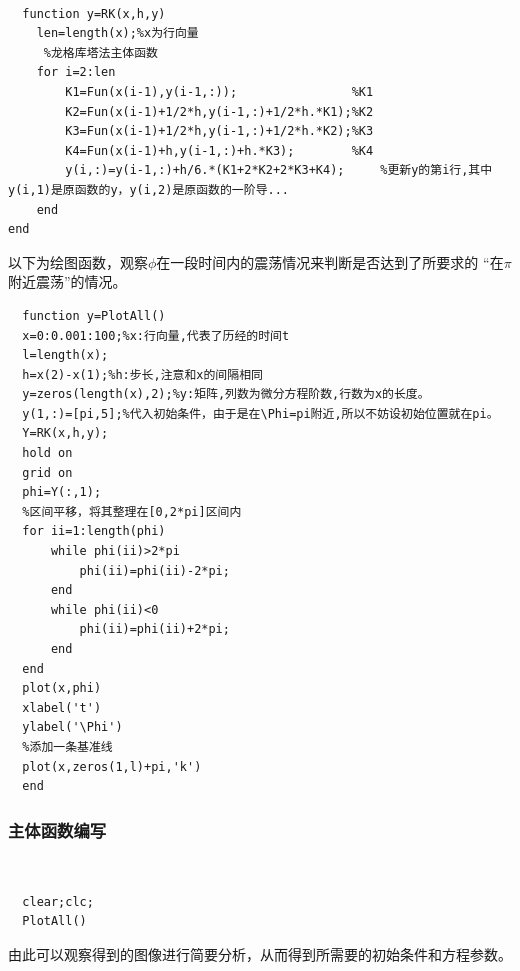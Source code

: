 \documentclass[UTF8,a4paper,10pt]{ctexart}
\begin{document}
~\\
\lstset{language=matlab}
\begin{lstlisting}
  function y=RK(x,h,y)
    len=length(x);%x为行向量
     %龙格库塔法主体函数
    for i=2:len
        K1=Fun(x(i-1),y(i-1,:));                %K1
        K2=Fun(x(i-1)+1/2*h,y(i-1,:)+1/2*h.*K1);%K2
        K3=Fun(x(i-1)+1/2*h,y(i-1,:)+1/2*h.*K2);%K3
        K4=Fun(x(i-1)+h,y(i-1,:)+h.*K3);        %K4
        y(i,:)=y(i-1,:)+h/6.*(K1+2*K2+2*K3+K4);     %更新y的第i行,其中y(i,1)是原函数的y，y(i,2)是原函数的一阶导...
    end
end
\end{lstlisting}
以下为绘图函数，观察$\phi $在一段时间内的震荡情况来判断是否达到了所要求的
“在$\pi$附近震荡”的情况。\newline
~\\
\lstset{language=matlab}
\begin{lstlisting}
  function y=PlotAll()
  x=0:0.001:100;%x:行向量,代表了历经的时间t
  l=length(x);
  h=x(2)-x(1);%h:步长,注意和x的间隔相同
  y=zeros(length(x),2);%y:矩阵,列数为微分方程阶数,行数为x的长度。
  y(1,:)=[pi,5];%代入初始条件，由于是在\Phi=pi附近,所以不妨设初始位置就在pi。
  Y=RK(x,h,y);
  hold on
  grid on
  phi=Y(:,1);
  %区间平移，将其整理在[0,2*pi]区间内
  for ii=1:length(phi)
      while phi(ii)>2*pi
          phi(ii)=phi(ii)-2*pi;
      end
      while phi(ii)<0
          phi(ii)=phi(ii)+2*pi;
      end
  end
  plot(x,phi)
  xlabel('t')
  ylabel('\Phi')
  %添加一条基准线
  plot(x,zeros(1,l)+pi,'k')
  end
\end{lstlisting}
\subsubsection{主体函数编写}
~\\
\lstset{language=matlab}
\begin{lstlisting}
  clear;clc;
  PlotAll()
\end{lstlisting}
由此可以观察得到的图像进行简要分析，从而得到所需要的初始条件和方程参数。
\end{document}
